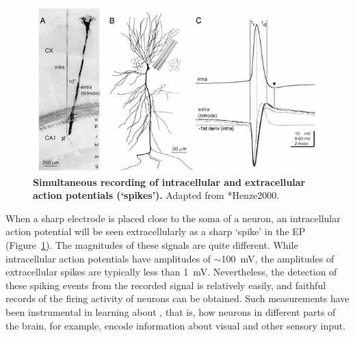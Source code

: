 \section{}
\label{Spikes:sec:EP-spikes}
%


\begin{figure}[!ht]
\begin{center}
\includegraphics{Figures/Spikes/Spikes-Henze-w100-r150}
\end{center}
\caption[Intracellular and extracellular action potentials]{\textbf{Simultaneous recording of intracellular and extracellular action potentials (`spikes').}
Adapted from \citeasnoun**{Henze2000}.
}
\label{Spikes:fig:Henze}
\end{figure}


When a sharp electrode is placed close to the soma of a neuron, an intracellular action potential will be seen
extracellularly as a sharp `spike' in the EP (Figure~\ref{Spikes:fig:Henze}). The magnitudes of these signals are quite different. While intracellular action potentials have amplitudes of $\sim$100~mV, the amplitudes of extracellular
spikes are typically less than 1~mV. Nevertheless, the detection of these spiking events from the recorded signal is relatively easily, and faithful records of the firing activity of neurons can be obtained. Such measurements have been instrumental in learning about , that is, how neurons in different parts of the brain, for example, encode information about visual and other sensory input. 

